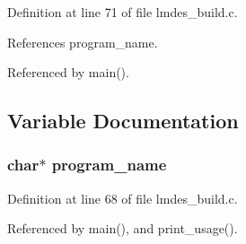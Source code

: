 Definition at line 71 of file lmdes\_\-build.c.

References program\_\-name.

Referenced by main().

\subsection{Variable Documentation}
\subsubsection{\setlength{\rightskip}{0pt plus 5cm}char$\ast$ \bf{program\_\-name}}\label{lmdes__build_8c_289c5900d90626d909f0a85d5a0ed61d}




Definition at line 68 of file lmdes\_\-build.c.

Referenced by main(), and print\_\-usage().